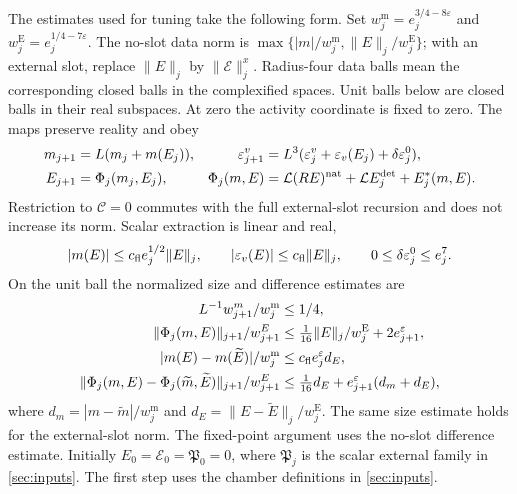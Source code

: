 The estimates used for tuning take the following form.
Set \(w_j^{\mathrm m}=e_j^{3/4-8\varepsilon}\) and
\(w_j^{\mathrm E}=e_j^{1/4-7\varepsilon}\).
The no-slot data norm is
\(\max\{|m|/w_j^{\mathrm m},\|E\|_j/w_j^{\mathrm E}\}\); with an external slot,
replace \(\|E\|_j\) by \(\|\mathscr E\|_j^x\).
Radius-four data balls mean the corresponding closed balls in the
complexified spaces. Unit balls below are closed balls in their real
subspaces. At zero the activity coordinate is fixed to zero.
The maps preserve reality and obey
\begin{align}
 m_{j+1}&=L(m_j+m(E_j)),&
 \varepsilon_{j+1}^v&=L^3(\varepsilon_j^v+\varepsilon_v(E_j)+\delta\varepsilon_j^0),
 \label{eq:cv-scalar-recursion}\\
 E_{j+1}&=\Phi_j(m_j,E_j),&
 \Phi_j(m,E)&=\mathcal L(RE)^{\rm nat}
                  +\mathcal LE_j^{\det}+E_j^*(m,E).
 \label{eq:cv-activity-recursion}
\end{align}
Restriction to \(\mathscr C=0\) commutes with the full external-slot recursion
and does not increase its norm. Scalar extraction is linear and real,
\[
 |m(E)|\le c_{\rm fl}e_j^{1/2}\|E\|_j,\qquad
 |\varepsilon_v(E)|\le c_{\rm fl}\|E\|_j,\qquad
 0\le\delta\varepsilon_j^0\le e_j^7.
\]
On the unit ball the normalized size and difference estimates are
\begin{equation}\label{eq:cv-normalized-inputs}
 \begin{aligned}
 L^{-1}w_{j+1}^m/w_j^{\mathrm m}&\le1/4,\\
 \|\Phi_j(m,E)\|_{j+1}/w_{j+1}^E
   &\le\tfrac1{16}\|E\|_j/w_j^{\mathrm E}+2e_{j+1}^{\varepsilon},\\
 |m(E)-m(\widetilde E)|/w_j^{\mathrm m}
   &\le c_{\rm fl}e_j^\varepsilon d_E,\\
 \|\Phi_j(m,E)-\Phi_j(\widetilde m,\widetilde E)\|_{j+1}/w_{j+1}^E
   &\le\tfrac1{16}d_E+e_{j+1}^\varepsilon(d_m+d_E),
 \end{aligned}
\end{equation}
where \(d_m=|m-\widetilde m|/w_j^{\mathrm m}\) and
\(d_E=\|E-\widetilde E\|_j/w_j^{\mathrm E}\).
The same size estimate holds for the external-slot norm. The
fixed-point argument uses the no-slot difference estimate.
Initially \(E_0=\mathscr E_0=\mathfrak P_0=0\), where
\(\mathfrak P_j\) is the scalar external family in \cref{sec:inputs}.
The first step uses the chamber definitions in \cref{sec:inputs}.

